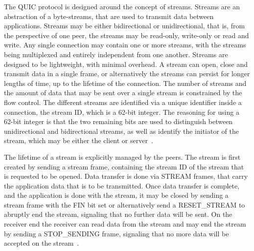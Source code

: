 \documentclass[english, 12pt, a4paper, elec, utf8, a-2b, online]{aaltothesis}
\begin{document}
The QUIC protocol is designed around the concept of streams. Streams are an abstraction
of a byte-streams, that are used to transmit data between applications. Streams may
be either bidirectional or unidirectional, that is, from the perspective of one peer,
the streams may be read-only, write-only or read and write. Any single connection may contain one or
more streams, with the streams being multiplexed and entirely independent from one
another. Streams are designed to be lightweight, with minimal overhead. A stream can
open, close and transmit data in a single frame, or alternatively the streams
can persist for longer lengths of time, up to the lifetime of the connection. The number
of streams and the amount of data that may be sent over a single stream is constrained
by the flow control. The different streams are identified via a unique identifier inside a connection,
the stream ID, which is a 62-bit integer. The reasoning for using a 62-bit integer is
that the two remaining bits are used to distinguish between unidirectional and bidirectional
streams, as well as identify the initiator of the stream, which may be either the
client or server~\cite{rfc9000}.

The lifetime of a stream is explicitly managed by the peers. The stream is first
created by sending a stream frame, containing the stream ID of the stream that is
requested to be opened. Data transfer is done via STREAM frames, that carry the
application data that is to be transmitted. Once data transfer is complete, and
the application is done with the stream, it may be closed by sending a stream
frame with the FIN bit set or alternatively send a RESET\_STREAM to abruptly end the
stream, signaling that no further data will be sent. On the receiver end the receiver
can read data from the stream and may end the stream by sending a STOP\_SENDING frame,
signaling that no more data will be accepted on the stream~\cite{rfc9000}.
\end{document}
